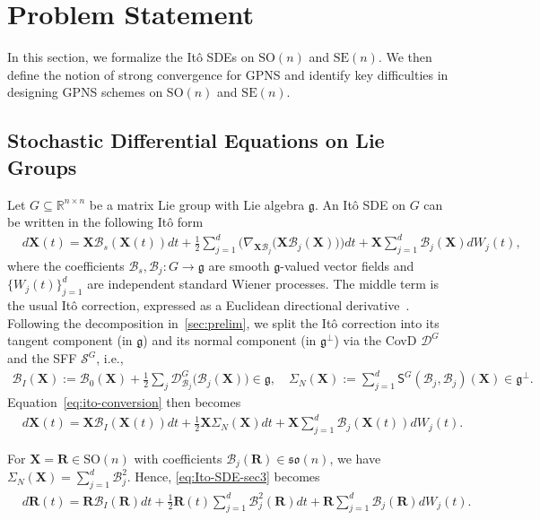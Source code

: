 \documentclass[11pt, a4paper, onecolumn]{article}
\newcommand{\SOn}{\mathrm{SO}(n)}
\newcommand{\son}{\mathfrak{so}(n)}
\newcommand{\SEn}{\mathrm{SE}(n)}
\renewcommand{\SS}{\mathsf{S}}
\newcommand{\X}{\bf{X}}
\newcommand{\D}{\tg {D}}
\newcommand{\bfR}{\mathbf{R}}
\newcommand{\B}{\mathcal{B}}
\renewcommand{\bf}[1]{\mathbf{#1}}
\newcommand{\tg}[1]{\mathcal{#1}}
\newcommand{\nm}[1]{\mathsf{#1}}
\newcommand{\half}{{\frac{1}{2}}}
\newcommand{\Der}[4]{
  #1_{#2}\bigl(#3(#4)\bigr)
}
\begin{document}
\section{Problem Statement}\label{sec:problem}
In this section, we formalize the It\^o SDEs on $\SOn$ and $\SEn$. We then define the notion of strong convergence for GPNS and identify key difficulties in designing GPNS schemes on $\SOn$ and $\SEn$.

\subsection{Stochastic Differential Equations on Lie Groups}
Let $G\subseteq\mathbb R^{n\times n}$ be a matrix Lie group with Lie algebra $\mathfrak g$.
An Itô SDE on $G$ can be written in the following It\^o form 
\begin{align}\label{eq:ito-conversion}
    & d\X(t) = \X\B_{s}(\X(t)) dt + \frac{1}{2} \sum_{j=1}^d  \Big(\Der{\nabla}{\X\B_j}{\X\B_j}{\X}\Big) dt + \X \sum_{j=1}^d \B_{j}(\X) dW_j(t),
\end{align}
where the coefficients $\B_s,\mathcal B_j\colon G\to\mathfrak g$ are smooth $\mathfrak g$-valued vector fields and $\{W_j(t)\}_{j=1}^{d}$ are independent standard Wiener processes. The middle term is the usual It\^o correction, expressed as a Euclidean directional derivative~\cite{le2016brownian}. Following the decomposition in~\cref{sec:prelim}, we split the It\^o correction into its tangent component (in $\mathfrak g$) and its normal component (in $\mathfrak g^{\perp}$) via the CovD $\mathcal D^{G}$ and the SFF $\mathcal S^{G}$, i.e.,
\begin{align*}
    \tg B_{I}(\X) := \B_0(\X) + \half \sum_j \Der{\D^G}{\B_j}{\B_j}{\X} \in \mathfrak g,  \quad 
    \nm \Sigma_N(\X):=  \sum_{j=1}^d  \SS^G(\B_j, \B_j)(\X)                      \in \mathfrak g^\perp.
\end{align*}
Equation~\eqref{eq:ito-conversion} then becomes
\begin{align}\label{eq:Ito-SDE-sec3}
    & d\bf X(t) = \bf X \tg B_{I}(\bf X(t)) dt + \half\bf X \nm \Sigma_N(\X) dt+  \bf X\sum_{j=1}^d \B_{j}(\bf X(t)) dW_j(t).
\end{align}

For $\mathbf X=\mathbf R\in\SOn$ with coefficients $\B_j(\mathbf R)\in\son$, we have $\nm \Sigma_N(\bf X)=\sum_{j=1}^d \B_j^2$. Hence, \cref{eq:Ito-SDE-sec3} becomes
\begin{align}\label{eq:I-SDE-son}
    & d\bf R(t) = \bf R \tg B_{I}(\bf R) dt + \half\mathbf R(t) \sum_{j=1}^{d} \B_{j}^{2}(\bfR)dt+  \bfR \sum_{j=1}^d \B_{j}(\bfR) dW_j(t).
\end{align}
\end{document}
